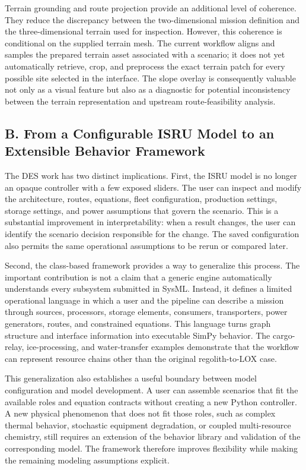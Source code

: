 Terrain grounding and route projection provide an additional level of coherence. They reduce the discrepancy between the two-dimensional mission definition and the three-dimensional terrain used for inspection. However, this coherence is conditional on the supplied terrain mesh. The current workflow aligns and samples the prepared terrain asset associated with a scenario; it does not yet automatically retrieve, crop, and preprocess the exact terrain patch for every possible site selected in the interface. The slope overlay is consequently valuable not only as a visual feature but also as a diagnostic for potential inconsistency between the terrain representation and upstream route-feasibility analysis.

\subsection{B. From a Configurable ISRU Model to an Extensible Behavior Framework}

The DES work has two distinct implications. First, the ISRU model is no longer an opaque controller with a few exposed sliders. The user can inspect and modify the architecture, routes, equations, fleet configuration, production settings, storage settings, and power assumptions that govern the scenario. This is a substantial improvement in interpretability: when a result changes, the user can identify the scenario decision responsible for the change. The saved configuration also permits the same operational assumptions to be rerun or compared later.

Second, the class-based framework provides a way to generalize this process. The important contribution is not a claim that a generic engine automatically understands every subsystem submitted in SysML. Instead, it defines a limited operational language in which a user and the pipeline can describe a mission through sources, processors, storage elements, consumers, transporters, power generators, routes, and constrained equations. This language turns graph structure and interface information into executable SimPy behavior. The cargo-relay, ice-processing, and water-transfer examples demonstrate that the workflow can represent resource chains other than the original regolith-to-LOX case.

This generalization also establishes a useful boundary between model configuration and model development. A user can assemble scenarios that fit the available roles and equation contracts without creating a new Python controller. A new physical phenomenon that does not fit those roles, such as complex thermal behavior, stochastic equipment degradation, or coupled multi-resource chemistry, still requires an extension of the behavior library and validation of the corresponding model. The framework therefore improves flexibility while making the remaining modeling assumptions explicit.

